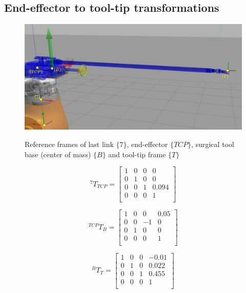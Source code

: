 \subsection{End-effector to tool-tip transformations}

\begin{center}
\begin{figure}[!htb]
\centering
\includegraphics[width=\textwidth]{images/eef_tcp_tip_tf.png}\\
\caption{Reference frames of last link $\lbrace 7 \rbrace$, end-effector $\lbrace TCP \rbrace$, surgical tool base (center of mass) $\lbrace B \rbrace$ and tool-tip frame $\lbrace T \rbrace$}
\end{figure}
\end{center}

\[
^{7}T_{TCP} = 
\begin{bmatrix}
1 & 0 & 0 & 0 \\
0 & 1 & 0 & 0 \\
0 & 0 & 1 & 0.094 \\
0 & 0 & 0 & 1 \\
\end{bmatrix}
\]

\[
^{TCP}T_{B} = 
\begin{bmatrix}
1 & 0 & 0 & 0.05 \\
0 & 0 & -1 & 0 \\
0 & 1 & 0 & 0 \\
0 & 0 & 0 & 1 \\
\end{bmatrix}
\]

\[
^{B}T_T = 
\begin{bmatrix}
1 & 0 & 0 & -0.01 \\
0 & 1 & 0 & 0.022 \\
0 & 0 & 1 & 0.455 \\
0 & 0 & 0 & 1 \\
\end{bmatrix}
\]


